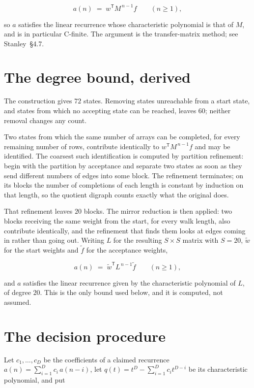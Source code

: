 \documentclass[11pt]{article}
\theoremstyle{definition}
\begin{document}
\[a(n) \;=\; w^{\mathsf T} M^{\,n-1} f \qquad (n \ge 1),\]

so $a$ satisfies the linear recurrence whose characteristic polynomial is that of $M$, and is in particular C-finite. The argument is the transfer-matrix method; see Stanley~\S4.7.

\section{The degree bound, derived}

The construction gives $72$ states. Removing states unreachable from a start state, and states from which no accepting state can be reached, leaves $60$; neither removal changes any count.

Two states from which the same number of arrays can be completed, for every remaining number of rows, contribute identically to $w^{\mathsf T}M^{\,n-1}f$ and may be identified. The coarsest such identification is computed by partition refinement: begin with the partition by acceptance and separate two states as soon as they send different numbers of edges into some block. The refinement terminates; on its blocks the number of completions of each length is constant by induction on that length, so the quotient digraph counts exactly what the original does.

That refinement leaves $20$ blocks. The mirror reduction is then applied: two blocks receiving the same weight from the start, for every walk length, also contribute identically, and the refinement that finds them looks at edges coming in rather than going out. Writing $L$ for the resulting $S \times S$ matrix with $S = 20$, $\tilde w$ for the start weights and $\tilde f$ for the acceptance weights,

\[a(n) \;=\; \tilde w^{\mathsf T} L^{\,n-1} \tilde f \qquad (n \ge 1),\]

and $a$ satisfies the linear recurrence given by the characteristic polynomial of $L$, of degree $20$. This is the only bound used below, and it is computed, not assumed.

\section{The decision procedure}

Let $c_1,\dots,c_D$ be the coefficients of a claimed recurrence $a(n) = \sum_{i=1}^{D} c_i\,a(n-i)$, let $q(t) = t^{D} - \sum_{i=1}^{D} c_i t^{D-i}$ be its characteristic polynomial, and put
\end{document}
